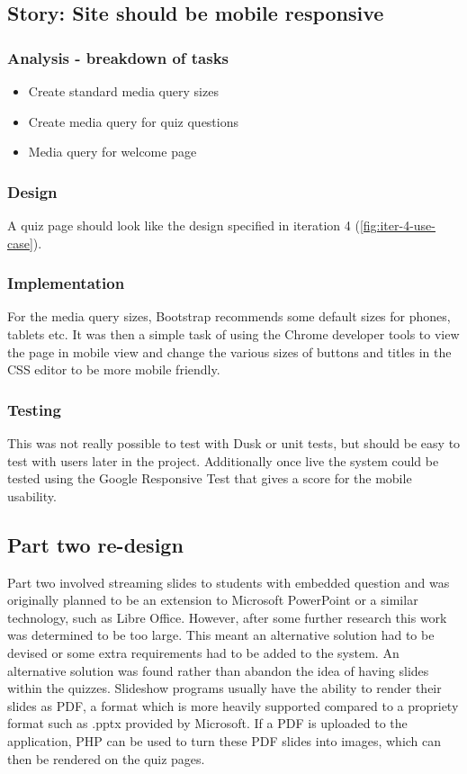 \subsection{Story: Site should be mobile responsive}
\subsubsection{Analysis - breakdown of tasks}
\begin{itemize}
	\item Create standard media query sizes
	\item Create media query for quiz questions
	\item Media query for welcome page
\end{itemize}
\subsubsection{Design}
A quiz page should look like the design specified in iteration 4 (\ref{fig:iter-4-use-case}).
\subsubsection{Implementation}
For the media query sizes, Bootstrap recommends some default sizes for phones, tablets etc\cite{bootstrap-media-queries}. It was then a simple task of using the Chrome developer tools to view the page in mobile view and change the various sizes of buttons and titles in the CSS editor to be more mobile friendly.
\subsubsection{Testing}
This was not really possible to test with Dusk or unit tests, but should be easy to test with users later in the project. Additionally once live the system could be tested using the Google Responsive Test that gives a score for the mobile usability.
\newpage

\subsection{Part two re-design}
Part two involved streaming slides to students with embedded question and was originally planned to be an extension to Microsoft PowerPoint or a similar technology, such as Libre Office. However, after some further research this work was determined to be too large. This meant an alternative solution had to be devised or some extra requirements had to be added to the system. An alternative solution was found rather than abandon the idea of having slides within the quizzes. Slideshow programs usually have the ability to render their slides as PDF, a format which is more heavily supported compared to a propriety format such as .pptx provided by Microsoft. If a PDF is uploaded to the application, PHP can be used to turn these PDF slides into images, which can then be rendered on the quiz pages.

